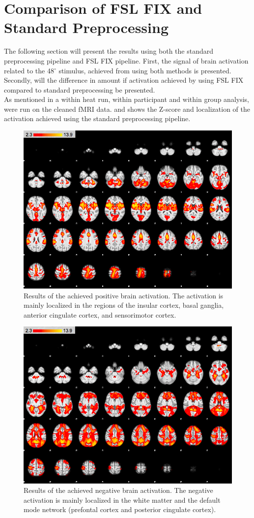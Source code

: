 \section{Comparison of FSL FIX and Standard Preprocessing}

The following section will present the results using both the standard preprocessing pipeline and FSL FIX pipeline. First, the signal of brain activation related to the 48$^\circ$ stimulus, achieved from using both methods is presented. Secondly, will the difference in amount if activation achieved by using FSL FIX compared to standard preprocessing be presented. \\
As mentioned in  a within heat run, within participant and within group analysis, were run on the cleaned fMRI data.  and  shows the Z-score and localization of the activation achieved using the standard preprocessing pipeline.  


\begin{figure}[H]                 
	\includegraphics[width=.65\textwidth]{figures/Results/STD_pos}  
	\caption{Results of the achieved positive brain activation. The activation is mainly localized in the regions of the insular cortex, basal ganglia, anterior cingulate cortex, and sensorimotor cortex.}
	\label{fig:res:stdpos} 
\end{figure}

\begin{figure}[H]                 
	\includegraphics[width=.65\textwidth]{figures/Results/STD_neg}  
	\caption{Results of the achieved negative brain activation. The negative activation is mainly localized in the white matter and the default mode network (prefontal cortex and posterior cingulate cortex).}
	\label{fig:res:stdneg} 
\end{figure}

